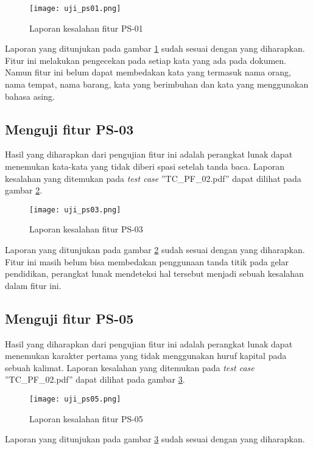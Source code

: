 \begin{figure}[H]
	\centering	
	\texttt{[image: uji\_ps01.png]}
	\caption{Laporan kesalahan fitur PS-01}	
	\label{fig:ujips01} 
\end{figure}

Laporan yang ditunjukan pada gambar \ref{fig:ujips01} sudah sesuai dengan yang diharapkan. Fitur ini melakukan pengecekan pada setiap kata yang ada pada dokumen. Namun fitur ini belum dapat membedakan kata yang termasuk nama orang, nama tempat, nama barang, kata yang berimbuhan dan kata yang menggunakan bahasa asing.

\subsection{Menguji fitur PS-03}
Hasil yang diharapkan dari pengujian fitur ini adalah perangkat lunak dapat menemukan kata-kata yang tidak diberi spasi setelah tanda baca. Laporan kesalahan yang ditemukan pada \textit{test case} ''TC\_PF\_02.pdf'' dapat dilihat pada gambar \ref{fig:ujips03}.

\begin{figure}[H]
	\centering	
	\texttt{[image: uji\_ps03.png]}
	\caption{Laporan kesalahan fitur PS-03}	
	\label{fig:ujips03} 
\end{figure}

Laporan yang ditunjukan pada gambar \ref{fig:ujips03} sudah sesuai dengan yang diharapkan. Fitur ini masih belum bisa membedakan penggunaan tanda titik pada gelar pendidikan, perangkat lunak mendeteksi hal tersebut menjadi sebuah kesalahan dalam fitur ini.

\subsection{Menguji fitur PS-05}
Hasil yang diharapkan dari pengujian fitur ini adalah perangkat lunak dapat menemukan karakter pertama yang tidak menggunakan huruf kapital pada sebuah kalimat. Laporan kesalahan yang ditemukan pada \textit{test case} ''TC\_PF\_02.pdf'' dapat dilihat pada gambar \ref{fig:ujips05}.

\begin{figure}[H]
	\centering	
	\texttt{[image: uji\_ps05.png]}
	\caption{Laporan kesalahan fitur PS-05}	
	\label{fig:ujips05} 
\end{figure}

Laporan yang ditunjukan pada gambar \ref{fig:ujips05} sudah sesuai dengan yang diharapkan.

